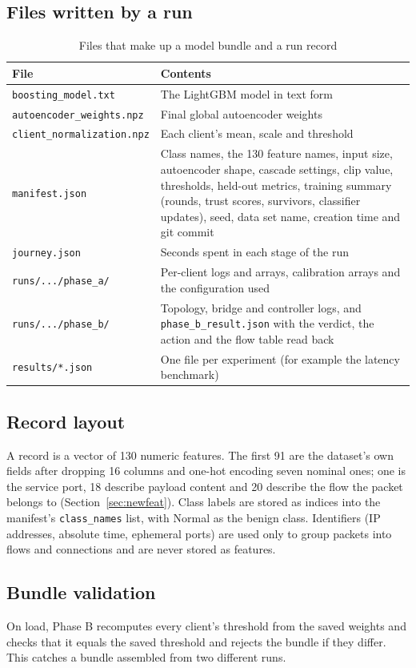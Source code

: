 \subsection{Files written by a run}
\begin{table}[H]
\centering
\scriptsize
\renewcommand{\arraystretch}{1.2}
\begin{tabular}{|>{\raggedright\arraybackslash}p{4.6cm}|>{\raggedright\arraybackslash}p{8.4cm}|}
\hline
\textbf{File} & \textbf{Contents} \\ \hline
\texttt{boosting\_model.txt} & The LightGBM model in text form \\ \hline
\texttt{autoencoder\_weights.npz} & Final global autoencoder weights \\ \hline
\texttt{client\_normalization.npz} & Each client's mean, scale and threshold \\ \hline
\texttt{manifest.json} & Class names, the 130 feature names, input size, autoencoder shape, cascade settings, clip value, thresholds, held-out metrics, training summary (rounds, trust scores, survivors, classifier updates), seed, data set name, creation time and git commit \\ \hline
\texttt{journey.json} & Seconds spent in each stage of the run \\ \hline
\texttt{runs/.../phase\_a/} & Per-client logs and arrays, calibration arrays and the configuration used \\ \hline
\texttt{runs/.../phase\_b/} & Topology, bridge and controller logs, and \texttt{phase\_b\_result.json} with the verdict, the action and the flow table read back \\ \hline
\texttt{results/*.json} & One file per experiment (for example the latency benchmark) \\ \hline
\end{tabular}
\caption{Files that make up a model bundle and a run record}
\label{tab:files}
\end{table}

\subsection{Record layout}
A record is a vector of 130 numeric features. The first 91 are the dataset's own fields after dropping 16 columns and one-hot encoding seven nominal ones; one is the service port, 18 describe payload content and 20 describe the flow the packet belongs to (Section~\ref{sec:newfeat}). Class labels are stored as indices into the manifest's \texttt{class\_names} list, with Normal as the benign class. Identifiers (IP addresses, absolute time, ephemeral ports) are used only to group packets into flows and connections and are never stored as features.

\subsection{Bundle validation}
On load, Phase B recomputes every client's threshold from the saved weights and checks that it equals the saved threshold and rejects the bundle if they differ. This catches a bundle assembled from two different runs.
